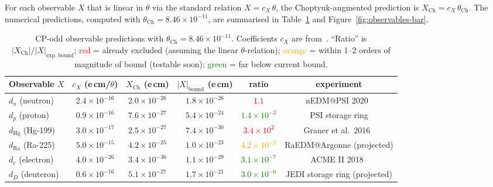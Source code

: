 For each observable $X$ that is linear in $\theta$ via the standard
relation $X = c_X\,\theta$, the Choptyuk-augmented prediction is
$X_{\mathrm{Ch}} = c_X\,\theta_{\mathrm{Ch}}$.  The numerical
predictions, computed with $\theta_{\mathrm{Ch}}=8.46\times 10^{-11}$,
are summarised in Table~\ref{tab:cp-predictions} and
Figure~\ref{fig:observables-bar}.

\begin{table}[htbp]
\centering
\small
\caption{CP-odd observable predictions with
$\theta_{\mathrm{Ch}}=8.46\times 10^{-11}$.
Coefficients $c_X$ are from~\cite{pospelovritz2005,hoferichter2025nEDM}.
``Ratio'' is $|X_{\mathrm{Ch}}|/|X|_{\mathrm{exp.\ bound}}$;
\textcolor{red}{red} = already excluded (assuming the linear
$\theta$-relation); \textcolor{orange}{orange} = within 1--2 orders of
magnitude of bound (testable soon); \textcolor{green}{green} = far below
current bound.}
\label{tab:cp-predictions}
\begin{tabularx}{\textwidth}{@{}lccccc@{}}
\toprule
Observable $X$ & $c_X$ (e\,cm/$\theta$) & $X_{\mathrm{Ch}}$ (e\,cm)
& $|X|_{\mathrm{bound}}$ (e\,cm) & ratio & experiment \\
\midrule
$d_n$ (neutron)   & $2.4\times 10^{-16}$ & $2.0\times 10^{-26}$
                  & $1.8\times 10^{-26}$
                  & \textcolor{red}{$1.1$}
                  & nEDM@PSI 2020~\cite{abel2020nEDM} \\
$d_p$ (proton)    & $0.9\times 10^{-16}$ & $7.6\times 10^{-27}$
                  & $5.4\times 10^{-24}$
                  & \textcolor{green}{$1.4\times 10^{-3}$}
                  & PSI storage ring \\
$d_{\mathrm{Hg}}$ (Hg-199) & $3.0\times 10^{-17}$ & $2.5\times 10^{-27}$
                  & $7.4\times 10^{-30}$
                  & \textcolor{red}{$3.4\times 10^{2}$}
                  & Graner et al.\ 2016~\cite{graner2016hg} \\
$d_{\mathrm{Ra}}$ (Ra-225) & $5.0\times 10^{-15}$ & $4.2\times 10^{-25}$
                  & $1.0\times 10^{-23}$
                  & \textcolor{orange}{$4.2\times 10^{-2}$}
                  & RaEDM@Argonne (projected) \\
$d_e$ (electron)  & $4.0\times 10^{-26}$ & $3.4\times 10^{-36}$
                  & $1.1\times 10^{-29}$
                  & \textcolor{green}{$3.1\times 10^{-7}$}
                  & ACME II 2018~\cite{andreev2018acme} \\
$d_D$ (deuteron)  & $0.6\times 10^{-16}$ & $5.1\times 10^{-27}$
                  & $1.7\times 10^{-21}$
                  & \textcolor{green}{$3.0\times 10^{-6}$}
                  & JEDI storage ring (projected) \\
\bottomrule
\end{tabularx}
\end{table}

